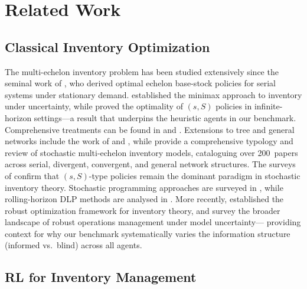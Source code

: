 \documentclass[preprint,12pt]{elsarticle}
\begin{document}
\section{Related Work}\label{sec:related}

\subsection{Classical Inventory Optimization}

The multi-echelon inventory problem has been studied extensively since the
seminal work of \citet{clark1960optimal}, who derived optimal echelon
base-stock policies for serial systems under stationary demand.
\citet{scarf1958minmax} established the minimax approach to inventory
under uncertainty, while \citet{iglehart1963optimality} proved the
optimality of $(s, S)$ policies in infinite-horizon settings---a result
that underpins the heuristic agents in our benchmark.
Comprehensive treatments can be found in \citet{zipkin2000foundations}
and \citet{porteus2002foundations}.
Extensions to tree and general networks include the work of
\citet{graves2000optimizing} and \citet{eruguz2016comprehensive}, while
\citet{dekok2018typology} provide a comprehensive typology and review
of stochastic multi-echelon inventory models, cataloguing over 200~papers
across serial, divergent, convergent, and general network structures.
The surveys of \citet{perera2023sssurvey_continuous, perera2023sssurvey_discrete}
confirm that $(s, S)$-type policies remain the dominant paradigm in
stochastic inventory theory.
Stochastic programming approaches are surveyed in
\citet{birge2011introduction}, while rolling-horizon DLP methods are
analysed in \citet{brown2010information}. More recently,
\citet{bertsimas2006robust} established the robust optimization framework
for inventory theory, and \citet{lu2021review} survey the broader
landscape of robust operations management under model uncertainty---
providing context for why our benchmark systematically varies the
information structure (informed vs.\ blind) across all agents.

\subsection{RL for Inventory Management}
\end{document}
